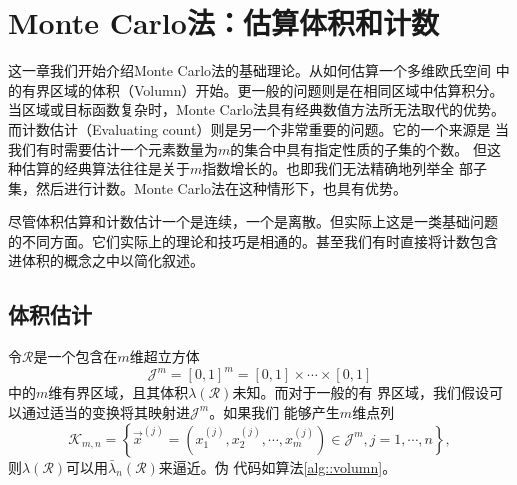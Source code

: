 \chapter{Monte Carlo法：估算体积和计数}

这一章我们开始介绍Monte Carlo法的基础理论。从如何估算一个多维欧氏空间
中的有界区域的体积（Volumn）开始。更一般的问题则是在相同区域中估算积分。
当区域或目标函数复杂时，Monte Carlo法具有经典数值方法所无法取代的优势。
而计数估计（Evaluating count）则是另一个非常重要的问题。它的一个来源是
当我们有时需要估计一个元素数量为$m$的集合中具有指定性质的子集的个数。
但这种估算的经典算法往往是关于$m$指数增长的。也即我们无法精确地列举全
部子集，然后进行计数。Monte Carlo法在这种情形下，也具有优势。

尽管体积估算和计数估计一个是连续，一个是离散。但实际上这是一类基础问题
的不同方面。它们实际上的理论和技巧是相通的。甚至我们有时直接将计数包含
进体积的概念之中以简化叙述。

\section{体积估计}

令$\mathscr{R}$是一个包含在$m$维超立方体
\begin{equation}
  \mathscr{J}^m = [0, 1]^m = [0, 1] \times \cdots \times [0, 1]
  \label{eq::hyper_cube}
\end{equation}
中的$m$维有界区域，且其体积$\lambda(\mathscr{R})$未知。而对于一般的有
界区域，我们假设可以通过适当的变换将其映射进$\mathscr{J}^m$。如果我们
能够产生$m$维点列
\begin{equation}
  \mathscr{K}_{m, n} = \left\{\vec{x}^{(j)} = (x_1^{(j)}, x_2^{(j)},
  \cdots, x_m^{(j)}) \in \mathscr{J}^m, j = 1, \cdots, n\right\},
  \label{eq::m_d_random_number}
\end{equation}
则$\lambda(\mathscr{R})$可以用$\bar{\lambda}_n(\mathscr{R})$来逼近。伪
代码如算法\ref{alg::volumn}。

